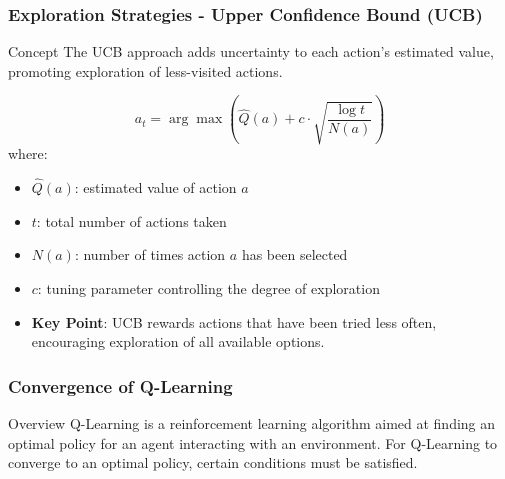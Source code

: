 \documentclass[aspectratio=169]{beamer}
\begin{document}
\begin{frame}[fragile]
    \frametitle{Exploration Strategies - Upper Confidence Bound (UCB)}
    \begin{block}{Concept}
        The UCB approach adds uncertainty to each action's estimated value, promoting exploration of less-visited actions.
    \end{block}
    \begin{equation}
        a_t = \arg\max \left( \hat{Q}(a) + c \cdot \sqrt{\frac{\log t}{N(a)}} \right)
    \end{equation}
    where:
    \begin{itemize}
        \item \(\hat{Q}(a)\): estimated value of action \(a\)
        \item \(t\): total number of actions taken
        \item \(N(a)\): number of times action \(a\) has been selected
        \item \(c\): tuning parameter controlling the degree of exploration
    \end{itemize}
    \begin{itemize}
        \item \textbf{Key Point}: UCB rewards actions that have been tried less often, encouraging exploration of all available options.
    \end{itemize}
\end{frame}

\begin{frame}[fragile]
    \frametitle{Convergence of Q-Learning}
    \begin{block}{Overview}
        Q-Learning is a reinforcement learning algorithm aimed at finding an optimal policy for an agent interacting with an environment. For Q-Learning to converge to an optimal policy, certain conditions must be satisfied.
    \end{block}
\end{frame}
\end{document}
